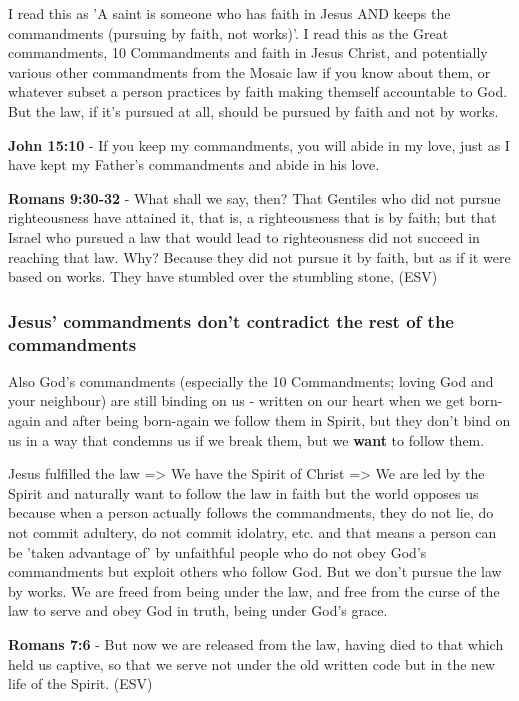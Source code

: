 \documentclass[11pt]{article}
\begin{document}
I read this as 'A saint is someone who has faith in Jesus AND keeps the commandments (pursuing by faith, not works)'.
I read this as the Great commandments, 10 Commandments and faith in Jesus Christ, and potentially various other commandments from the Mosaic law if you know about them, or whatever subset a person practices by faith making themself accountable to God.
But the law, if it's pursued at all, should be pursued by faith and not by works.

\textbf{John 15:10} - If you keep my commandments, you will abide in my love, just as I have kept my Father's commandments and abide in his love.

\textbf{Romans 9:30-32} - What shall we say, then? That Gentiles who did not pursue righteousness have attained it, that is, a righteousness that is by faith; but that Israel who pursued a law that would lead to righteousness did not succeed in reaching that law. Why? Because they did not pursue it by faith, but as if it were based on works. They have stumbled over the stumbling stone, (ESV)

\subsubsection{Jesus' commandments don't contradict the rest of the commandments}
\label{sec:org63ba6ea}
Also God's commandments (especially the 10 Commandments; loving God and your neighbour) are still binding on us - written on our heart when we get born-again and after being born-again we follow them in Spirit, but they don't bind on us in a way that condemns us if we  break them, but we \textbf{want} to follow them.

Jesus fulfilled the law => We have the Spirit of Christ => We are led by the Spirit and naturally want to follow the law in faith but the world opposes us because when a person actually follows the commandments, they do not lie, do not commit adultery, do not commit idolatry, etc. and that means a person can be 'taken advantage of' by unfaithful people who do not obey God's commandments but exploit others who follow God.
But we don't pursue the law by works. We are freed from being under the law, and free from the curse of the law to serve and obey God in truth, being under God's grace.

\textbf{Romans 7:6} - But now we are released from the law, having died to that which held us captive, so that we serve not under the old written code but in the new life of the Spirit. (ESV)
\end{document}

